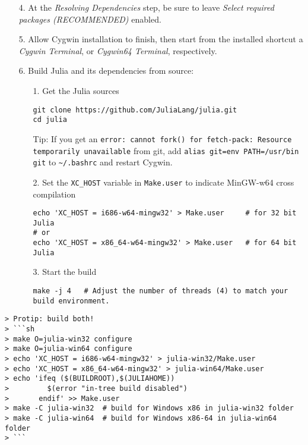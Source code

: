 \begin{itemize}
\begin{itemize}
\end{itemize}

\item[4. ] At the \emph{{\textquotesingle}Resolving Dependencies{\textquotesingle}} step, be sure to leave \emph{{\textquotesingle}Select required packages (RECOMMENDED){\textquotesingle}} enabled.


\item[5. ] Allow Cygwin installation to finish, then start from the installed shortcut a \emph{{\textquotesingle}Cygwin Terminal{\textquotesingle}}, or \emph{{\textquotesingle}Cygwin64 Terminal{\textquotesingle}}, respectively.


\item[6. ] Build Julia and its dependencies from source:

\begin{itemize}
\item[1. ] Get the Julia sources


\begin{lstlisting}
git clone https://github.com/JuliaLang/julia.git
cd julia
\end{lstlisting}

Tip: If you get an \texttt{error: cannot fork() for fetch-pack: Resource temporarily unavailable} from git, add \texttt{alias git={\textquotedbl}env PATH=/usr/bin git{\textquotedbl}} to \texttt{{\textasciitilde}/.bashrc} and restart Cygwin.


\item[2. ] Set the \texttt{XC\_HOST} variable in \texttt{Make.user} to indicate MinGW-w64 cross compilation


\begin{lstlisting}
echo 'XC_HOST = i686-w64-mingw32' > Make.user     # for 32 bit Julia
# or
echo 'XC_HOST = x86_64-w64-mingw32' > Make.user   # for 64 bit Julia
\end{lstlisting}


\item[3. ] Start the build


\begin{lstlisting}
make -j 4   # Adjust the number of threads (4) to match your build environment.
\end{lstlisting}

\end{itemize}
\end{itemize}



\begin{lstlisting}
> Protip: build both!
> ```sh
> make O=julia-win32 configure
> make O=julia-win64 configure
> echo 'XC_HOST = i686-w64-mingw32' > julia-win32/Make.user
> echo 'XC_HOST = x86_64-w64-mingw32' > julia-win64/Make.user
> echo 'ifeq ($(BUILDROOT),$(JULIAHOME))
>         $(error "in-tree build disabled")
>       endif' >> Make.user
> make -C julia-win32  # build for Windows x86 in julia-win32 folder
> make -C julia-win64  # build for Windows x86-64 in julia-win64 folder
> ```
\end{lstlisting}



